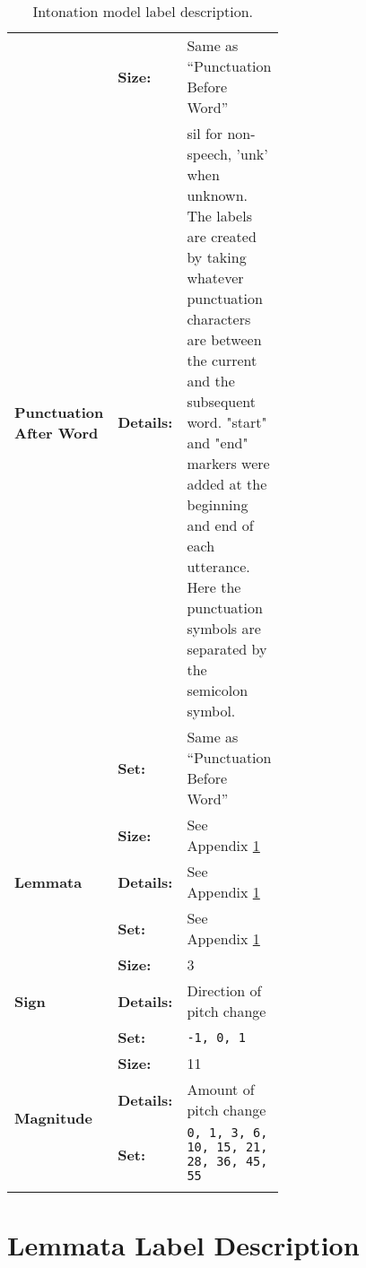 \begin{longtable}[c]{llp{0.6\linewidth}}
\multirow{3}{0.18\linewidth}{{\bf Punctuation After Word}}
          & {\bf Size:} 
                                & Same as ``Punctuation Before Word'' \\
          & {\bf Details:} 
                                & \textlangle{}sil\textrangle{} for non-speech, '\textlangle{}unk\textrangle{}' when unknown. The labels are created by taking whatever punctuation characters are between the current and the subsequent word. "start" and "end" markers were added at the beginning and end of each utterance. Here the punctuation symbols are separated by the semicolon symbol. \\
          & {\bf Set:} 
                                & Same as ``Punctuation Before Word'' \\ 
            \midrule


\multirow{3}{0.18\linewidth}{{\bf Lemmata}}
          & {\bf Size:} 
                                & See Appendix \ref{chap:appendix-b}  \\
          & {\bf Details:} 
                                & See Appendix \ref{chap:appendix-b} \\
          & {\bf Set:} 
                                & See Appendix \ref{chap:appendix-b} \\ 
            \midrule

\multirow{3}{0.18\linewidth}{{\bf Sign}}
          & {\bf Size:} 
                                & 3 \\
          & {\bf Details:} 
                                & Direction of pitch change \\
          & {\bf Set:} 
                                & \verb|-1, 0, 1| \\ 
                                \midrule

\multirow{3}{0.18\linewidth}{{\bf Magnitude}}
          & {\bf Size:} 
                                & 11 \\
          & {\bf Details:} 
                                & Amount of pitch change \\
          & {\bf Set:} 
                                & \verb|0, 1, 3, 6, 10, 15, 21, 28, 36, 45, 55| \\ 


\bottomrule
\caption{Intonation model label description.}
\label{f0-labels-table}
\end{longtable}


\chapter{Lemmata Label Description}\label{chap:appendix-b}


